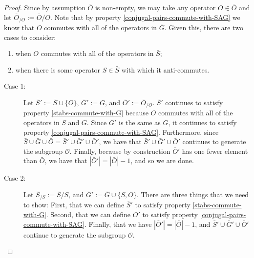 \documentclass[twocolumn,showpacs,preprintnumbers,amsmath,amssymb,nofootinbib,pra,floatfix]{revtex4}
\newcommand{\lst}{\bar}
\begin{document}
\begin{proof}
Since by assumption $\lst O$ is non-empty, we may take any operator $O\in \lst O$ and let $\lst O_{\slash O}:=\lst O\slash O$.  Note that by property \ref{conjugal-pairs-commute-with-SAG} we know that $O$ commutes with all of the operators in $\lst G$.  Given this, there are two cases to consider:
\begin{enumerate}
\item when $O$ commutes with all of the operators in $\lst S$;
\item when there is some operator $S\in\lst S$ with which it anti-commutes.
\end{enumerate}

\begin{description}
\item[Case 1:]
Let $\lst S':= \lst S \cup \{O\}$, $\lst G' := G$, and $\lst O' := \lst O_{\slash O}$.  $\lst S'$ continues to satisfy property \ref{stabs-commute-with-G} because $O$ commutes with all of the operators in $\lst S$ and $\lst G$.  Since $\lst G'$ is the same as $\lst G$, it continues to satisfy property \ref{conjugal-pairs-commute-with-SAG}.  Furthermore, since $\lst S\cup \lst G \cup \lst O=\lst S' \cup \lst G' \cup \lst O'$, we have that $\lst S' \cup \lst G' \cup \lst O'$ continues to generate the subgroup $\mathcal{O}$.  Finally, because by construction $\lst O'$ has one fewer element than $\lst O$, we have that $|\lst O'|=|\lst O|-1$, and so we are done.
\item[Case 2:]
Let $\lst S_{\slash S}:=\lst S\slash S$, and $\lst G' := \lst G \cup \{S,O\}$.  There are three things that we need to show:  First, that we can define $\lst S'$ to satisfy property \ref{stabs-commute-with-G}.  Second, that we can define $\lst O'$ to satisfy property \ref{conjugal-pairs-commute-with-SAG}.  Finally, that we have $|\lst O'|=|\lst O|-1$, and  $\lst S' \cup \lst G' \cup \lst O'$ continue to generate the subgroup $\mathcal{O}$.


\end{description}
\end{proof}
\end{document}
